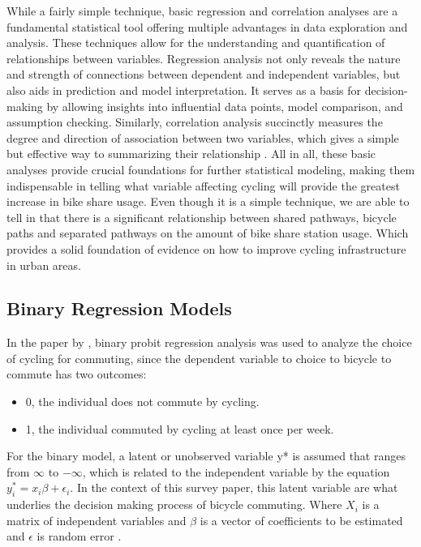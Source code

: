 \documentclass[12pt, letterpaper]{article}
\begin{document}
While a fairly simple technique, basic regression and correlation analyses are a fundamental statistical tool offering multiple advantages in data exploration and analysis. These techniques  allow for the understanding and quantification of relationships between variables. Regression analysis not only reveals the nature and strength of connections between dependent and independent variables, but also aids in prediction and model interpretation. It serves as a basis for decision-making by allowing insights into influential data points, model comparison, and assumption checking. Similarly, correlation analysis succinctly measures the degree and direction of association between two  variables, which gives a simple but effective way to summarizing their relationship \cite{Bewick_Cheek_Ball_2003}. All in all, these basic analyses provide crucial foundations for further statistical modeling, making them indispensable in telling what variable affecting cycling will provide the greatest increase in bike share usage. Even though it is a simple technique, we are able to tell in \citet{1MateoBabiano2016} that there is a significant relationship between shared pathways, bicycle paths and separated pathways on the amount of bike share station usage. Which provides a solid foundation of evidence on how to improve cycling infrastructure in urban areas. 

\subsection{Binary Regression Models}
\label{sec:bin}

In the paper by \citet{2Yujun2019}, binary probit regression analysis was used to analyze the choice of cycling for commuting, since the dependent variable to choice to bicycle to commute has two outcomes:

\begin{itemize}
    \item 0, the individual does not commute by cycling.
    \item 1, the individual commuted by cycling at least once per week.
\end{itemize}
    
For the binary model, a latent or unobserved variable y* is assumed that ranges from $\infty$ to $-\infty$, which is related to the independent variable by the equation $y^{*}_{i} = x_{i}\beta + \epsilon_{i}$. In the context of this survey paper, this latent variable are what underlies the decision making process of bicycle commuting. Where $X_{i}$ is a matrix of independent variables and $\beta$ is a vector of coefficients to be estimated and $\epsilon$ is random error \cite{LONG2001}. 
\end{document}

